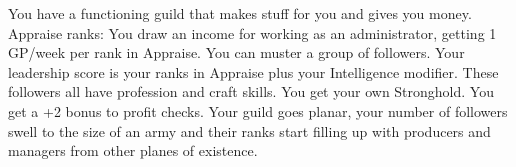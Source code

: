 \skillfeat
{You have a functioning guild that makes stuff for you and gives you money.}
{Appraise ranks:}
{You draw an income for working as an administrator, getting 1 GP/week per rank in Appraise.}
{You can muster a group of followers. Your leadership score is your ranks in Appraise plus your Intelligence modifier. These followers all have profession and craft skills.}
{You get your own Stronghold.}
{You get a +2 bonus to profit checks.}
{Your guild goes planar, your number of followers swell to the size of an army and their ranks start filling up with producers and managers from other planes of existence.}
